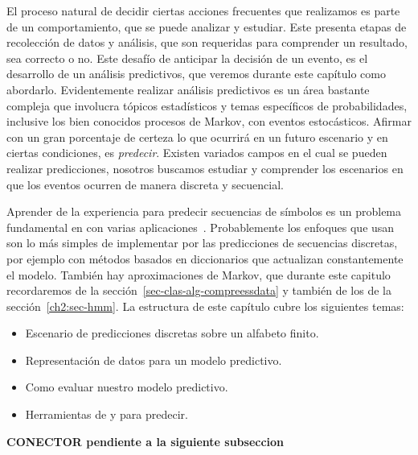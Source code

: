 El proceso natural de decidir ciertas acciones frecuentes que realizamos es parte de un comportamiento, que se puede analizar y estudiar. Este presenta etapas de recolección de datos  y análisis, que son requeridas para comprender un resultado, sea correcto o no. Este desafío de anticipar la decisión de un evento, es el desarrollo de un análisis predictivos, que veremos durante este capítulo como abordarlo. Evidentemente realizar análisis predictivos es un área bastante compleja que involucra tópicos estadísticos y temas específicos de probabilidades, inclusive los bien conocidos procesos de Markov, con eventos estocásticos. Afirmar con un gran porcentaje de certeza lo que ocurrirá en un futuro escenario y en ciertas condiciones, es \emph{predecir}. Existen variados campos en el cual se pueden realizar predicciones, nosotros buscamos estudiar y comprender los escenarios en que los eventos ocurren de manera discreta y secuencial. 
\newline

Aprender de la experiencia para predecir secuencias de símbolos es un problema fundamental en \machinelearning con varias aplicaciones~\cite{Laird1994}. Probablemente los enfoques que usan \losslessdatacompression son lo más simples de implementar por las predicciones de secuencias discretas, por ejemplo con métodos basados en diccionarios que actualizan constantemente el modelo. También hay aproximaciones de Markov, que durante este capitulo recordaremos de la sección~\ref{sec-clas-alg-compreessdata} y también de los \HMM de la sección~\ref{ch2:sec-hmm}. La estructura de este capítulo cubre los siguientes temas:
\begin{itemize}
	\menorEspacioItemize
	\item Escenario de predicciones discretas sobre un alfabeto finito.
	\item Representación de datos para un modelo predictivo.
	\item Como evaluar nuestro modelo predictivo.
	\item Herramientas de \machinelearning y \losslessdatacompression para predecir.
\end{itemize}




\textbf{CONECTOR pendiente a la siguiente subseccion}